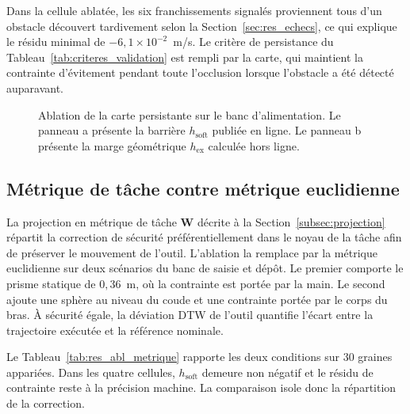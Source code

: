 Dans la cellule ablatée, les six franchissements signalés proviennent tous d'un obstacle découvert tardivement selon la Section~\ref{sec:res_echecs}, ce qui explique le résidu minimal de $-6{,}1\times10^{-2}$~m/s. Le critère de persistance du Tableau~\ref{tab:criteres_validation} est rempli par la carte, qui maintient la contrainte d'évitement pendant toute l'occlusion lorsque l'obstacle a été détecté auparavant.

\begin{figure}[!htbp]
    \centering
    
    \caption[Impact de la carte persistante sur les barrières]{Ablation de la carte persistante sur le banc d'alimentation. Le panneau a présente la barrière $h_{\mathrm{soft}}$ publiée en ligne. Le panneau b présente la marge géométrique $h_{\mathrm{ex}}$ calculée hors ligne.}\label{fig:res_persistance}
\end{figure}

\subsection{Métrique de tâche contre métrique euclidienne}\label{subsec:res_abl_metrique}
La projection en métrique de tâche $\mathbf{W}$ décrite à la Section~\ref{subsec:projection} répartit la correction de sécurité préférentiellement dans le noyau de la tâche afin de préserver le mouvement de l'outil. L'ablation la remplace par la métrique euclidienne sur deux scénarios du banc de saisie et dépôt. Le premier comporte le prisme statique de $0{,}36$~m, où la contrainte est portée par la main. Le second ajoute une sphère au niveau du coude et une contrainte portée par le corps du bras. À sécurité égale, la déviation \ac{DTW} de l'outil quantifie l'écart entre la trajectoire exécutée et la référence nominale.

Le Tableau~\ref{tab:res_abl_metrique} rapporte les deux conditions sur $30$ graines appariées. Dans les quatre cellules, $h_{\mathrm{soft}}$ demeure non négatif et le résidu de contrainte reste à la précision machine. La comparaison isole donc la répartition de la correction.

